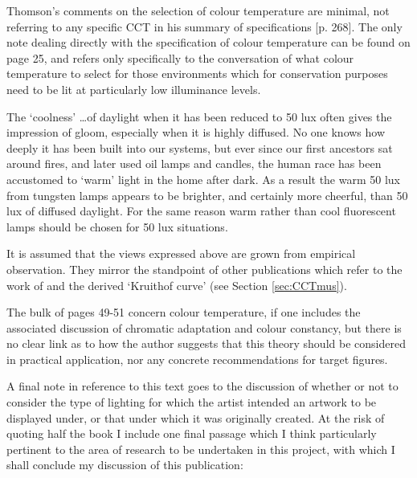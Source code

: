 Thomson's comments on the selection of colour temperature are minimal, not referring to any specific \gls{CCT} in his summary of specifications [p. 268]. The only note dealing directly with the specification of colour temperature can be found on page 25, and refers only specifically to the conversation of what colour temperature to select for those environments which for conservation purposes need to be lit at particularly low illuminance levels.

\begin{itquote}{}
The `coolness' \dots of daylight when it has been reduced to 50 lux often gives the impression of gloom, especially when it is highly diffused. No one knows how deeply it has been built into our systems, but ever since our first ancestors sat around fires, and later used oil lamps and candles, the human race has been accustomed to `warm' light in the home after dark. As a result the warm 50 lux from tungsten lamps appears to be brighter, and certainly more cheerful, than 50 lux of diffused daylight. For the same reason warm rather than cool fluorescent lamps should be chosen for 50 lux situations.
\end{itquote}

It is assumed that the views expressed above are grown from empirical observation. They mirror the standpoint of other publications which refer to the work of \citet{kruithof_tubular_1941} and the derived `Kruithof curve' (see Section \ref{sec:CCTmus}).

The bulk of pages 49-51 concern colour temperature, if one includes the associated discussion of chromatic adaptation and colour constancy, but there is no clear link as to how the author suggests that this theory should be considered in practical application, nor any concrete recommendations for target figures.

A final note in reference to this text goes to the discussion of whether or not to consider the type of lighting for which the artist intended an artwork to be displayed under, or that under which it was originally created. At the risk of quoting half the book I include one final passage which I think particularly pertinent to the area of research to be undertaken in this project, with which I shall conclude my discussion of this publication:

